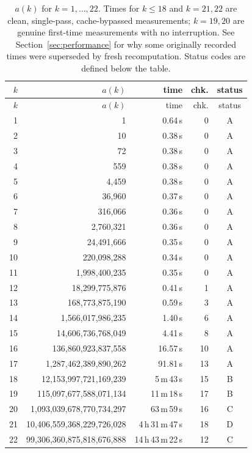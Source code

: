\documentclass[11pt]{amsart}
\begin{document}
{\footnotesize
\begin{longtable}{@{} r r r r c @{}}
\caption{$a(k)$ for $k=1,\dots,22$. Times for $k \leq 18$ and $k=21,22$
are clean, single-pass, cache-bypassed measurements; $k=19,20$ are
genuine first-time measurements with no interruption. See
Section~\ref{sec:performance} for why some originally recorded times
were superseded by fresh recomputation. Status codes are defined below
the table.}
\label{tab:results} \\
\toprule
$k$ & $a(k)$ & time & chk. & status \\
\midrule
\endfirsthead
\toprule
$k$ & $a(k)$ & time & chk. & status \\
\midrule
\endhead
1  & 1 & 0.64\,s & 0 & A \\
2  & 10 & 0.38\,s & 0 & A \\
3  & 72 & 0.38\,s & 0 & A \\
4  & 559 & 0.38\,s & 0 & A \\
5  & 4{,}459 & 0.38\,s & 0 & A \\
6  & 36{,}960 & 0.37\,s & 0 & A \\
7  & 316{,}066 & 0.36\,s & 0 & A \\
8  & 2{,}760{,}321 & 0.36\,s & 0 & A \\
9  & 24{,}491{,}666 & 0.35\,s & 0 & A \\
10 & 220{,}098{,}288 & 0.34\,s & 0 & A \\
11 & 1{,}998{,}400{,}235 & 0.35\,s & 0 & A \\
12 & 18{,}299{,}775{,}876 & 0.41\,s & 1 & A \\
13 & 168{,}773{,}875{,}190 & 0.59\,s & 3 & A \\
14 & 1{,}566{,}017{,}986{,}235 & 1.40\,s & 6 & A \\
15 & 14{,}606{,}736{,}768{,}049 & 4.41\,s & 8 & A \\
16 & 136{,}860{,}923{,}837{,}558 & 16.57\,s & 10 & A \\
17 & 1{,}287{,}462{,}389{,}890{,}262 & 91.81\,s & 13 & A \\
18 & 12{,}153{,}997{,}721{,}169{,}239 & 5\,m\,43\,s & 15 & B \\
19 & 115{,}097{,}677{,}588{,}071{,}134 & 11\,m\,18\,s & 17 & B \\
20 & 1{,}093{,}039{,}678{,}770{,}734{,}297 & 63\,m\,59\,s & 16 & C \\
21 & 10{,}406{,}559{,}368{,}229{,}726{,}028 & 4\,h\,31\,m\,47\,s & 18 & D \\
22 & 99{,}306{,}360{,}875{,}818{,}676{,}888 & 14\,h\,43\,m\,22\,s & 12 & C \\
\bottomrule
\end{longtable}
}
\end{document}
